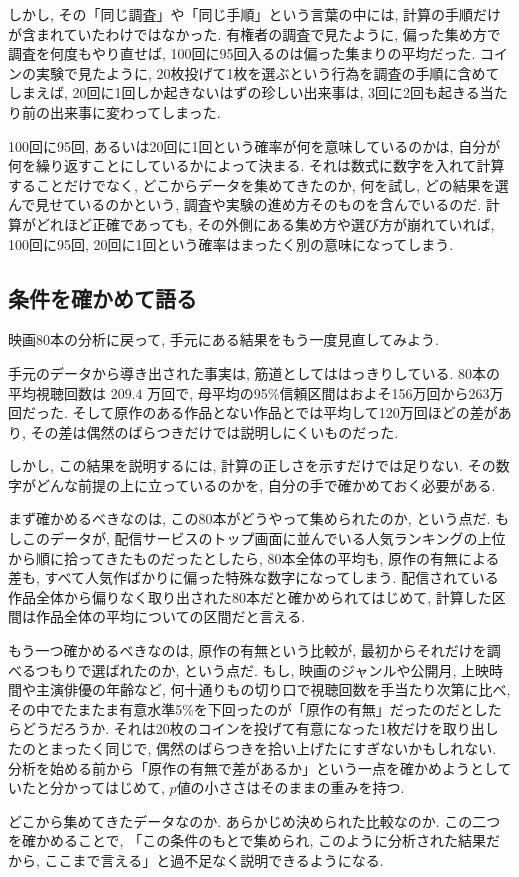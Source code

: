     しかし, その「同じ調査」や「同じ手順」という言葉の中には, 計算の手順だけが含まれていたわけではなかった.
    有権者の調査で見たように, 偏った集め方で調査を何度もやり直せば, 100回に95回入るのは偏った集まりの平均だった.
    コインの実験で見たように, 20枚投げて1枚を選ぶという行為を調査の手順に含めてしまえば, 20回に1回しか起きないはずの珍しい出来事は, 3回に2回も起きる当たり前の出来事に変わってしまった.

    100回に95回, あるいは20回に1回という確率が何を意味しているのかは, 自分が何を繰り返すことにしているかによって決まる.
    それは数式に数字を入れて計算することだけでなく, どこからデータを集めてきたのか, 何を試し, どの結果を選んで見せているのかという, 調査や実験の進め方そのものを含んでいるのだ.
    計算がどれほど正確であっても, その外側にある集め方や選び方が崩れていれば, 100回に95回, 20回に1回という確率はまったく別の意味になってしまう.

  \subsection{条件を確かめて語る}

    映画80本の分析に戻って, 手元にある結果をもう一度見直してみよう.

    手元のデータから導き出された事実は, 筋道としてははっきりしている.
    80本の平均視聴回数は $209.4$ 万回で, 母平均の95\%信頼区間はおよそ156万回から263万回だった.
    そして原作のある作品とない作品とでは平均して120万回ほどの差があり, その差は偶然のばらつきだけでは説明しにくいものだった.

    しかし, この結果を説明するには, 計算の正しさを示すだけでは足りない.
    その数字がどんな前提の上に立っているのかを, 自分の手で確かめておく必要がある.

    まず確かめるべきなのは, この80本がどうやって集められたのか, という点だ.
    もしこのデータが, 配信サービスのトップ画面に並んでいる人気ランキングの上位から順に拾ってきたものだったとしたら, 80本全体の平均も, 原作の有無による差も, すべて人気作ばかりに偏った特殊な数字になってしまう.
    配信されている作品全体から偏りなく取り出された80本だと確かめられてはじめて, 計算した区間は作品全体の平均についての区間だと言える.

    もう一つ確かめるべきなのは, 原作の有無という比較が, 最初からそれだけを調べるつもりで選ばれたのか, という点だ.
    もし, 映画のジャンルや公開月, 上映時間や主演俳優の年齢など, 何十通りもの切り口で視聴回数を手当たり次第に比べ, その中でたまたま有意水準5\%を下回ったのが「原作の有無」だったのだとしたらどうだろうか.
    それは20枚のコインを投げて有意になった1枚だけを取り出したのとまったく同じで, 偶然のばらつきを拾い上げたにすぎないかもしれない.
    分析を始める前から「原作の有無で差があるか」という一点を確かめようとしていたと分かってはじめて, $p$値の小ささはそのままの重みを持つ.

    どこから集めてきたデータなのか.
    あらかじめ決められた比較なのか.
    この二つを確かめることで, 「この条件のもとで集められ, このように分析された結果だから, ここまで言える」と過不足なく説明できるようになる.
